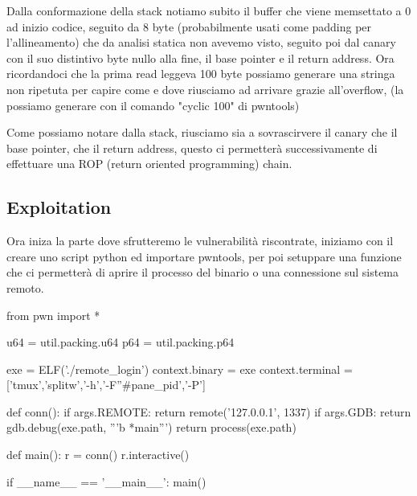 \documentclass[main.tex]{subfiles}
\begin{document}
Dalla conformazione della stack notiamo subito il buffer che viene memsettato a 0 ad inizio codice, seguito da 8 byte (probabilmente usati come padding per l'allineamento) che da analisi statica non avevemo visto, seguito poi dal canary con il suo distintivo byte nullo alla fine, il base pointer e il return address.
Ora ricordandoci che la prima read leggeva 100 byte possiamo generare una stringa non ripetuta per capire come e dove riusciamo ad arrivare grazie all'overflow, (la possiamo generare con il comando "cyclic 100" di pwntools)
\newpage
\begin{figure}[h]
    \centering
    \captionsetup{aboveskip=0pt}
\end{figure}

Come possiamo notare dalla stack, riusciamo sia a sovrascirvere il canary che il base pointer, che il return address, questo ci permetterà successivamente di effettuare una ROP (return oriented programming) chain.

\hspace*{1in}
\subsection{Exploitation}

Ora iniza la parte dove sfrutteremo le vulnerabilità riscontrate, iniziamo con il creare uno script python ed importare pwntools, per poi setuppare una funzione che ci permetterà di aprire il processo del binario o una connessione sul sistema remoto.

\begin{python}
from pwn import *

u64 = util.packing.u64
p64 = util.packing.p64

exe = ELF('./remote_login')
context.binary = exe
context.terminal = ['tmux','splitw','-h','-F''#{{pane_pid}}','-P']

def conn():
    if args.REMOTE:
	return remote('127.0.0.1', 1337)
    if args.GDB:
	return gdb.debug(exe.path, '''b *main\ncontinue\n''')
    return process(exe.path)

def main():
    r = conn()
    r.interactive()

if __name__ == '__main__':
    main()
\end{python}
\end{document}
